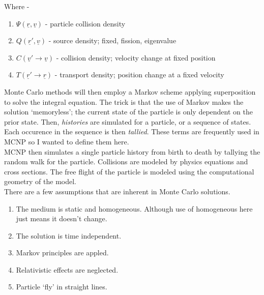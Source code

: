 \documentclass[11pt,a4paper]{article}
\begin{document}
\noindent Where - \\
\begin{enumerate}[topsep=0pt,itemsep=-1ex,partopsep=1ex,parsep=1ex]
    \item[]$\Psi(\underline{r},\underline{v})$ - particle collision density
    \item[]$Q(\underline{r}',\underline{v})$ - source density; fixed, fission, eigenvalue
    \item[]$C(\underline{v}'\rightarrow\underline{v})$ - collision density; velocity change at fixed position
    \item[]$T(\underline{r}'\rightarrow\underline{r})$ - transport density; position change at a fixed velocity
\end{enumerate}
\vspace*{\baselineskip}

\noindent Monte Carlo methods will then employ a Markov scheme applying superposition to solve the integral equation. The trick is that the use of Markov makes the solution `memoryless'; the current state of the particle is only dependent on the prior state. Then, \textit{histories} are simulated for a particle, or a sequence of states. Each occurence in the sequence is then \textit{tallied}. These terms are frequently used in MCNP so I wanted to define them here. \\

\noindent MCNP then simulates a single particle history from birth to death by tallying the random walk for the particle. Collisions are modeled by physics equations and cross sections. The free flight of the particle is modeled using the computational geometry of the model. \\

\noindent There are a few assumptions that are inherent in Monte Carlo solutions. 
\begin{enumerate}[topsep=0pt,itemsep=-1ex,partopsep=1ex,parsep=1ex]
    \item The medium is static and homogeneous. Although use of homogeneous here just means it doesn't change. 
    \item The solution is time independent. 
    \item Markov principles are appled. 
    \item Relativistic effects are neglected.
    \item Particle `fly' in straight lines. 
\end{enumerate}
\vspace*{\baselineskip}
\end{document}
